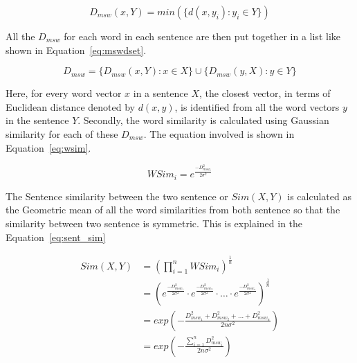 \begin{equation}\label{eq:msd}
    D_{msw}(x,Y) = min(\{d(x,y_i) : y_i \in Y \})
\end{equation}

All the $D_{msw}$ for each word in each sentence are then put together in a list like shown in
Equation~\ref{eq:mswdset}.

\begin{equation}
    D_{msw} = \{D_{msw}(x,Y) : x \in X\} \cup \{D_{msw}(y,X) : y \in Y\}
    \label{eq:mswdset}
\end{equation}

Here, for every word vector $x$ in a sentence $X$, the closest vector, in terms of
Euclidean distance denoted by $d(x,y)$, is identified from all the word vectors $y$ in the sentence $Y$.
Secondly, the word similarity is calculated using Gaussian similarity for each of these $D_{msw}$.
The equation involved is shown in Equation~\ref{eq:wsim}.

\begin{equation}\label{eq:wsim}
    WSim_i = e^{\frac{-D_{msw_i}^2}{2\sigma^2}}
\end{equation}

The Sentence similarity between the two sentence or $Sim(X,Y)$ is calculated as the Geometric
mean of all the word similarities from both sentence so that the similarity between two sentence is symmetric.
This is explained in the Equation~\ref{eq:sent_sim}

\begin{equation}\label{eq:sent_sim}
    \begin{split}
        Sim(X,Y)
        &=  \left(
                \prod_{i=1}^nWSim_i
            \right)^{\frac{1}{n}}\\
        &=  \left(
                e^{\frac{-D_{msw_1}^2}{2\sigma^2}}\cdot
                e^{\frac{-D_{msw_2}^2}{2\sigma^2}}\cdot
                    \ldots \cdot
                e^{\frac{-D_{msw_n}^2}{2\sigma^2}}
            \right)^\frac{1}{n}\\
        &=  exp\left(
                -\frac{D_{msw_1}^2+D_{msw_2}^2+\ldots+D_{msw_n}^2}{2n\sigma^2}
            \right)\\
        &=  exp\left(
                -\frac{\sum_{i=1}^nD_{msw_i}^2}{2n\sigma^2}
            \right)
    \end{split}
\end{equation}


